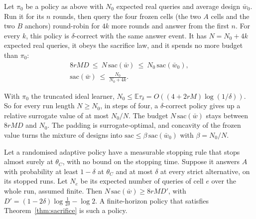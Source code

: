 \begin{theorem}
\label{thm:dilute}
Let $\pi_{0}$ be a policy as above with $N_{0}$ expected real queries and average design
$\bar w_{0}$. Run it for its $n$ rounds, then query the four frozen cells (the two $A$ cells and the two $B$ anchors) round-robin for $4k$ more
rounds and answer from the first $n$. For every $k$, this policy is $\delta$-correct with the same
answer event. It has $N=N_{0}+4k$ expected real queries, it obeys the sacrifice law, and it spends
no more budget than $\pi_{0}$:
\begin{gather*}
8rMD\ \le\ N\,\mathrm{sac}(\bar w)\ \le\ N_{0}\,\mathrm{sac}(\bar w_{0}),\\
\mathrm{sac}(\bar w)\ \le\ \frac{N_{0}}{N_{0}+4k}.
\end{gather*}
\end{theorem}


With $\pi_{0}$ the truncated ideal learner, $N_{0}\le\mathbb{E}\tau_{\delta}
=O((4+2rM)\log(1/\delta))$. So for every run length $N\ge N_{0}$, in steps of four, a
$\delta$-correct policy gives up a relative surrogate value of at most $N_{0}/N$. The budget
$N\,\mathrm{sac}(\bar w)$ stays between $8rMD$ and $N_{0}$. The padding is surrogate-optimal, and
concavity of the frozen value turns the mixture of designs into
$\mathrm{sac}\le\beta\,\mathrm{sac}(\bar w_{0})$ with $\beta=N_{0}/N$.

\begin{theorem}
\label{thm:sacstop}
Let a randomised adaptive policy have a measurable stopping rule that stops almost surely at
$\theta_{C}$, with no bound on the stopping time. Suppose it answers $A$ with probability at least
$1-\delta$ at $\theta_{C}$ and at most $\delta$ at every strict alternative, on its stopped runs.
Let $N_{e}$ be its expected number of queries of cell $e$ over the whole run, assumed finite. Then
$N\,\mathrm{sac}(\bar w)\ge8rMD'$, with $D'=(1-2\delta)\log\frac1{2\delta}-\log2$. A finite-horizon
policy that satisfies Theorem~\ref{thm:sacrifice} is such a policy.
\end{theorem}


